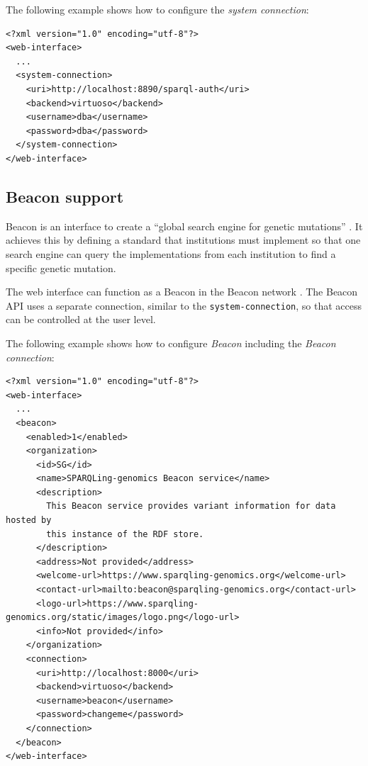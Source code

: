   The following example shows how to configure the \emph{system connection}:

\begin{siderules}
\begin{verbatim}
<?xml version="1.0" encoding="utf-8"?>
<web-interface>
  ...
  <system-connection>
    <uri>http://localhost:8890/sparql-auth</uri>
    <backend>virtuoso</backend>
    <username>dba</username>
    <password>dba</password>
  </system-connection>
</web-interface>
\end{verbatim}
\end{siderules}

\subsection{Beacon support}

  Beacon is an interface to create a ``global search engine for genetic
  mutations'' \citep{beacon-network}.  It achieves this by defining a
  standard that institutions must implement so that one search engine can
  query the implementations from each institution to find a specific
  genetic mutation.

  The web interface can function as a Beacon in the Beacon network
  \citep{beacon-network}.  The Beacon API uses a separate connection,
  similar to the \texttt{system-connection}, so that access can be
  controlled at the user level.

  The following example shows how to configure \emph{Beacon} including the
  \emph{Beacon connection}:

\begin{siderules}
\begin{verbatim}
<?xml version="1.0" encoding="utf-8"?>
<web-interface>
  ...
  <beacon>
    <enabled>1</enabled>
    <organization>
      <id>SG</id>
      <name>SPARQLing-genomics Beacon service</name>
      <description>
        This Beacon service provides variant information for data hosted by
        this instance of the RDF store.
      </description>
      <address>Not provided</address>
      <welcome-url>https://www.sparqling-genomics.org</welcome-url>
      <contact-url>mailto:beacon@sparqling-genomics.org</contact-url>
      <logo-url>https://www.sparqling-genomics.org/static/images/logo.png</logo-url>
      <info>Not provided</info>
    </organization>
    <connection>
      <uri>http://localhost:8000</uri>
      <backend>virtuoso</backend>
      <username>beacon</username>
      <password>changeme</password>
    </connection>
  </beacon>
</web-interface>
\end{verbatim}
\end{siderules}

